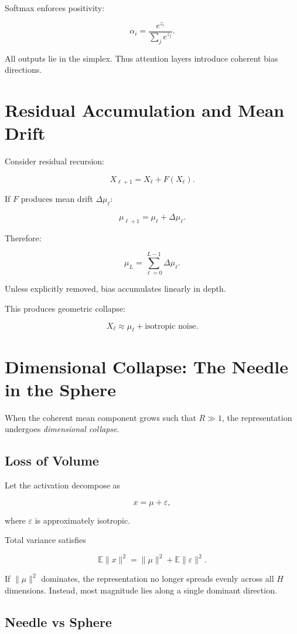 Softmax enforces positivity:

\[
\alpha_i = \frac{e^{z_i}}{\sum_j e^{z_j}}.
\]

All outputs lie in the simplex.
Thus attention layers introduce coherent bias directions.

\section{Residual Accumulation and Mean Drift}

Consider residual recursion:

\[
X_{\ell+1} = X_\ell + F(X_\ell).
\]

If $F$ produces mean drift $\Delta \mu_\ell$:

\[
\mu_{\ell+1} = \mu_\ell + \Delta \mu_\ell.
\]

Therefore:

\[
\mu_L = \sum_{\ell=0}^{L-1} \Delta \mu_\ell.
\]

Unless explicitly removed, bias accumulates linearly in depth.

This produces geometric collapse:

\[
X_\ell \approx \mu_\ell + \text{isotropic noise}.
\]

\section{Dimensional Collapse: The Needle in the Sphere}

When the coherent mean component grows such that $R \gg 1$,
the representation undergoes \emph{dimensional collapse}.

\subsection{Loss of Volume}

Let the activation decompose as

\[
x = \mu + \varepsilon,
\]

where $\varepsilon$ is approximately isotropic.

Total variance satisfies

\[
\mathbb{E}\|x\|^2 = \|\mu\|^2 + \mathbb{E}\|\varepsilon\|^2.
\]

If $\|\mu\|^2$ dominates,
the representation no longer spreads evenly across all $H$ dimensions.
Instead, most magnitude lies along a single dominant direction.

\subsection{Needle vs Sphere}

